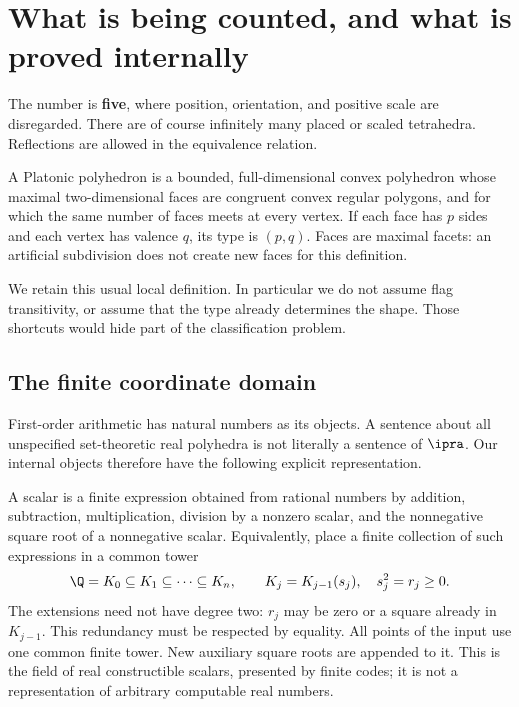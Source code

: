 \section{What is being counted, and what is proved internally}

The number is \textbf{five}, where position, orientation, and positive scale
are disregarded. There are of course infinitely many placed or scaled
tetrahedra. Reflections are allowed in the equivalence relation.

\begin{definition}
A Platonic polyhedron is a bounded, full-dimensional convex polyhedron
whose maximal two-dimensional faces are congruent convex regular polygons,
and for which the same number of faces meets at every vertex. If each
face has $p$ sides and each vertex has valence $q$, its type is $(p,q)$.
Faces are maximal facets: an artificial subdivision does not create new
faces for this definition.
\end{definition}

We retain this usual local definition. In particular we do not assume
flag transitivity, or assume that the type already determines the shape.
Those shortcuts would hide part of the classification problem.

\subsection{The finite coordinate domain}

First-order arithmetic has natural numbers as its objects. A sentence
about all unspecified set-theoretic real polyhedra is not literally a
sentence of $\ipra$. Our internal objects therefore have the following
explicit representation.

A scalar is a finite expression obtained from rational numbers by
addition, subtraction, multiplication, division by a nonzero scalar,
and the nonnegative square root of a nonnegative scalar. Equivalently,
place a finite collection of such expressions in a common tower
\[
 \Q=K_0\subseteq K_1\subseteq\cdots\subseteq K_n,
 \qquad K_j=K_{j-1}(s_j),\quad s_j^2=r_j\geq0.
\]
The extensions need not have degree two: $r_j$ may be zero or a square
already in $K_{j-1}$. This redundancy must be respected by equality.
All points of the input use one common finite tower. New auxiliary square
roots are appended to it. This is the field of real constructible scalars,
presented by finite codes; it is not a representation of arbitrary
computable real numbers.

